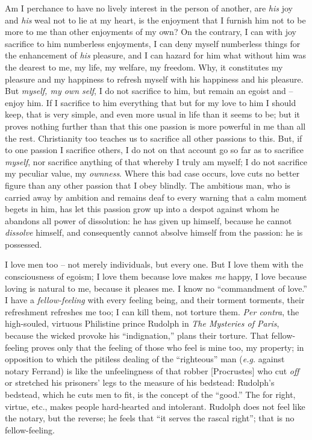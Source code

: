 Am I perchance to have no lively interest in the person of another, are 
\textit{his} joy and \textit{his} weal not to lie at my heart, is the 
enjoyment that I furnish him not to be more to me than other enjoyments of my 
own? On the contrary, I can with joy sacrifice to him numberless enjoyments, I 
can deny myself numberless things for the enhancement of \textit{his} 
pleasure, and I can hazard for him what without him was the dearest to me, my 
life, my welfare, my freedom. Why, it constitutes my pleasure and my happiness 
to refresh myself with his happiness and his pleasure. But \textit{myself, my 
own self}, I do not sacrifice to him, but remain an egoist and -- enjoy him. 
If I sacrifice to him everything that but for my love to him I should keep, 
that is very simple, and even more usual in life than it seems to be; but it 
proves nothing further than that this one passion is more powerful in me than 
all the rest. Christianity too teaches us to sacrifice all other passions to 
this. But, if to one passion I sacrifice others, I do not on that account go 
so far as to sacrifice \textit{myself}, nor sacrifice anything of that whereby 
I truly am myself; I do not sacrifice my peculiar value, my \textit{ownness}. 
Where this bad case occurs, love cuts no better figure than any other passion 
that I obey blindly. The ambitious man, who is carried away by ambition and 
remains deaf to every warning that a calm moment begets in him, has let this 
passion grow up into a despot against whom he abandons all power of 
dissolution: he has given up himself, because he cannot \textit{dissolve} 
himself, and consequently cannot absolve himself from the passion: he is 
possessed.

I love men too -- not merely individuals, but every one. But I love them with 
the consciousness of egoism; I love them because love makes \textit{me} happy, 
I love because loving is natural to me, because it pleases me. I know no 
``commandment of love.'' I have a \textit{fellow-feeling} with every feeling 
being, and their torment torments, their refreshment refreshes me too; I can 
kill them, not torture them. \textit{Per contra}, the high-souled, virtuous 
Philistine prince Rudolph in \textit{The Mysteries of Paris}, because the 
wicked provoke his ``indignation,'' plans their torture. That fellow-feeling 
proves only that the feeling of those who feel is mine too, my property; in 
opposition to which the pitiless dealing of the ``righteous'' man 
(\textit{e.g.} against notary Ferrand) is like the unfeelingness of that 
robber [Procrustes] who cut \textit{off} or stretched his prisoners' legs to 
the measure of his bedstead: Rudolph's bedstead, which he cuts men to fit, is 
the concept of the ``good.'' The for right, virtue, etc., makes people 
hard-hearted and intolerant. Rudolph does not feel like the notary, but the 
reverse; he feels that ``it serves the rascal right''; that is no 
fellow-feeling.

